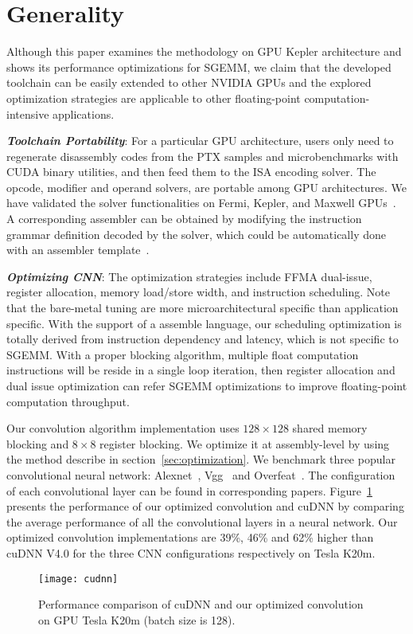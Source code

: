 \section{Generality}
\label{sec:generality}

Although this paper examines the methodology on GPU Kepler architecture and shows its performance optimizations for SGEMM, we claim that the developed toolchain can be easily extended to other NVIDIA GPUs and the explored optimization strategies are applicable to other floating-point computation-intensive applications.

{\em {\bf Toolchain Portability}}: For a particular GPU architecture, users only need to regenerate disassembly codes from the PTX samples and microbenchmarks with CUDA binary utilities, and then feed them to the ISA encoding solver.
The opcode, modifier and operand solvers, are portable among GPU architectures. 
We have validated the solver functionalities on Fermi, Kepler, and Maxwell GPUs~\cite{artifact}. 
A corresponding assembler can be obtained by modifying the instruction grammar definition decoded by the solver, which could be automatically done with an assembler template~\cite{baldassin2005extending}.

{\em {\bf Optimizing CNN}}: The optimization strategies include
FFMA dual-issue, register allocation, memory load/store width, and instruction
scheduling. Note that the bare-metal tuning are more microarchitectural specific than application specific. With the support of a assemble language, our scheduling optimization is totally derived from instruction dependency and latency, which is not specific to SGEMM. With a proper blocking algorithm, multiple float computation instructions will be reside in a single loop iteration, then register allocation and dual issue optimization can refer SGEMM optimizations to improve floating-point computation throughput. 

Our convolution algorithm implementation uses $128\times128$ shared memory blocking and
$8\times8$ register blocking. We optimize it at assembly-level by using the method describe in section~\ref{sec:optimization}.
We benchmark three popular convolutional neural network:
Alexnet~\cite{krizhevsky2012imagenet}, Vgg~\cite{simonyan2014very} and
Overfeat~\cite{sermanet2013overfeat}.  The configuration of each convolutional
layer can be found in corresponding papers.
Figure~\ref{fig:conv} presents the performance of our optimized convolution and cuDNN by comparing the average performance of all the convolutional layers in a neural network. %
Our optimized convolution implementations are 39\%, 46\% and 62\% higher than cuDNN V4.0 for the three CNN configurations respectively on Tesla K20m.

\begin{figure}[htbp]
\begin{center}
\texttt{[image: cudnn]}
    \caption{Performance comparison of cuDNN and our optimized convolution on GPU Tesla K20m (batch size is 128).}
\label{fig:conv}
\end{center}
\end{figure}
